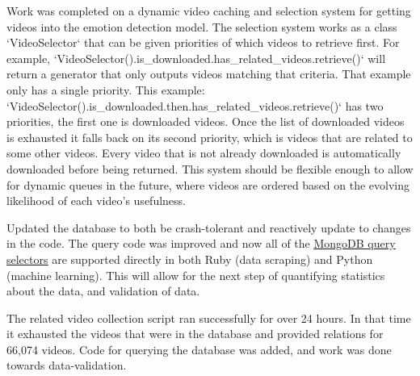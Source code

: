 \documentclass{article}
\newcommand{\br}{ \hfill \break}
\begin{document}
%
%
%
\date{June 7\&8 2020} \br \begin{adjustwidth}{2.5em}{0pt}
Work was completed on a dynamic video caching and selection system for getting videos into the emotion detection model. The selection system works as a class `VideoSelector` that can be given priorities of which videos to retrieve first. For example, `VideoSelector().is\_downloaded.has\_related\_videos.retrieve()` will return a generator that only outputs videos matching that criteria. That example only has a single priority. This example: \br `VideoSelector().is\_downloaded.then.has\_related\_videos.retrieve()` has two priorities, the first one is downloaded videos. Once the list of downloaded videos is exhausted it falls back on its second priority, which is videos that are related to some other videos. Every video that is not already downloaded is automatically downloaded before being returned. This system should be flexible enough to allow for dynamic queues in the future, where videos are ordered based on the evolving likelihood of each video's usefulness. 
\end{adjustwidth} \br

%
%
%
\date{June 4\&5 2020} \br \begin{adjustwidth}{2.5em}{0pt}
Updated the database to both be crash-tolerant and reactively update to changes in the code. The query code was improved and now all of the \href{https://docs.mongodb.com/manual/reference/operator/query/#query-selectors}{\underline{MongoDB query selectors}} are supported directly in both Ruby (data scraping) and Python (machine learning). This will allow for the next step of quantifying statistics about the data, and validation of data.
\end{adjustwidth} \br


%
%
%
\date{June 2 2020} \br \begin{adjustwidth}{2.5em}{0pt}
The related video collection script ran successfully for over 24 hours. In that time it exhausted the videos that were in the database and provided relations for 66,074 videos. Code for querying the database was added, and work was done towards data-validation.
\end{adjustwidth} \br
\end{document}
